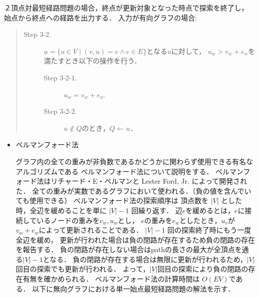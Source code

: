 \documentclass[12pt]{optlab-bachelor}
\begin{document}
２頂点対最短経路問題の場合，終点が更新対象となった時点で探索を終了し，
始点から終点への経路を出力する．
入力が有向グラフの場合:
\begin{quote}
\begin{description}
\item[Step 3-2.] $u = \{ u \in V \mid (v,u) = e \land e \in E \}$となる$u$に対して，
$u_w > v_w + e_w$を満たすとき以下の操作を行う．
\begin{description}
  \item[Step 3-2-1.] $u_w = v_w + e_w$.
  \item[Step 3-2-2.] $u \notin Q$のとき，$Q \leftarrow u$．
\end{description}
\end{description}
\end{quote}

\begin{itemize}
  \item ベルマンフォード法

  グラフ内の全ての重みが非負数であるかどうかに関わらず使用できる有名なアルゴリズムである
  ベルマンフォード法について説明をする．
  ベルマンフォード法はリチャード・E・ベルマンと Lester Ford, Jr. \cite{Bellman}によって開発された．
  全ての重みが実数であるグラフにおいて使われる．（負の値を含んでいても使用できる）
  ベルマンフォード法の探索順序は
  頂点数を $|V|$ とした時，全辺を緩めることを単に $|V|-1$ 回繰り返す．
  辺$e$を緩めるとは，$e$に接続しているノードの重みを$v_w,u_w$とし，
  $e$の重みを$e_w$としたとき，$u_v$が$v_w+e_w$によって更新されることである．
  $|V|-1$ 回の探索終了時にもう一度全辺を緩め，
  更新が行われた場合は負の閉路が存在するため負の閉路の存在を報告する．
  負の閉路が存在しない場合はpathの長さの最大が全頂点を通る$|V|-1$となる．
  負の閉路が存在する場合は無限に更新が行われるため，$|V|$回目の探索でも更新が行われる．
  よって，$|V|$回目の探索により負の閉路の存在有無を確かめられる．
  ベルマンフォード法の計算時間は $O(EV)$である．
  以下に無向グラフにおける単一始点最短経路問題の解法を示す．


\end{itemize}
\end{document}
